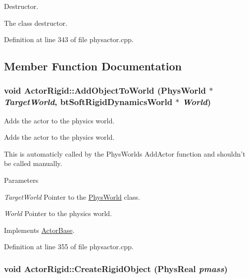 Destructor. 

The class destructor. 

Definition at line 343 of file physactor.cpp.



\subsection{Member Function Documentation}
\hypertarget{classActorRigid_ac6d7e05944623329f0c2140c19e2c49e}{
\subsubsection[{AddObjectToWorld}]{\setlength{\rightskip}{0pt plus 5cm}void ActorRigid::AddObjectToWorld ({\bf PhysWorld} $\ast$ {\em TargetWorld}, \/  btSoftRigidDynamicsWorld $\ast$ {\em World})}}
\label{d5/d10/classActorRigid_ac6d7e05944623329f0c2140c19e2c49e}


Adds the actor to the physics world. 

Adds the actor to the physics world. \par
 This is automaticly called by the PhysWorlds AddActor function and shouldn't be called manually. 
\begin{DoxyParams}{Parameters}
\item[{\em TargetWorld}]Pointer to the \hyperlink{classPhysWorld}{PhysWorld} class. \item[{\em World}]Pointer to the physics world. \end{DoxyParams}


Implements \hyperlink{classActorBase_a1af82a2ed960fd114518fdf84d5ff146}{ActorBase}.



Definition at line 355 of file physactor.cpp.

\hypertarget{classActorRigid_ac651eed187c3cb912bc7f294f0b42ad1}{
\subsubsection[{CreateRigidObject}]{\setlength{\rightskip}{0pt plus 5cm}void ActorRigid::CreateRigidObject (PhysReal {\em pmass})}}
\label{d5/d10/classActorRigid_ac651eed187c3cb912bc7f294f0b42ad1}


